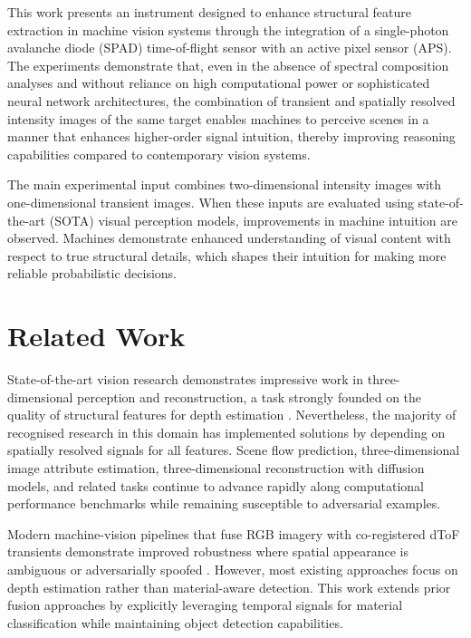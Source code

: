 \documentclass[10pt,twocolumn]{article}
\begin{document}
This work presents an instrument designed to enhance structural feature extraction in machine vision systems through the integration of a single-photon avalanche diode (SPAD) time-of-flight sensor with an active pixel sensor (APS). The experiments demonstrate that, even in the absence of spectral composition analyses and without reliance on high computational power or sophisticated neural network architectures, the combination of transient and spatially resolved intensity images of the same target enables machines to perceive scenes in a manner that enhances higher-order signal intuition, thereby improving reasoning capabilities compared to contemporary vision systems.

The main experimental input combines two-dimensional intensity images with one-dimensional transient images. When these inputs are evaluated using state-of-the-art (SOTA) visual perception models, improvements in machine intuition are observed. Machines demonstrate enhanced understanding of visual content with respect to true structural details, which shapes their intuition for making more reliable probabilistic decisions.

\section{Related Work}

State-of-the-art vision research demonstrates impressive work in three-dimensional perception and reconstruction, a task strongly founded on the quality of structural features for depth estimation \cite{laga2022}. Nevertheless, the majority of recognised research in this domain has implemented solutions by depending on spatially resolved signals for all features. Scene flow prediction, three-dimensional image attribute estimation, three-dimensional reconstruction with diffusion models, and related tasks continue to advance rapidly along computational performance benchmarks while remaining susceptible to adversarial examples.

Modern machine-vision pipelines that fuse RGB imagery with co-registered dToF transients demonstrate improved robustness where spatial appearance is ambiguous or adversarially spoofed \cite{moramartin2021,yang2024}. However, most existing approaches focus on depth estimation rather than material-aware detection. This work extends prior fusion approaches by explicitly leveraging temporal signals for material classification while maintaining object detection capabilities.
\end{document}
